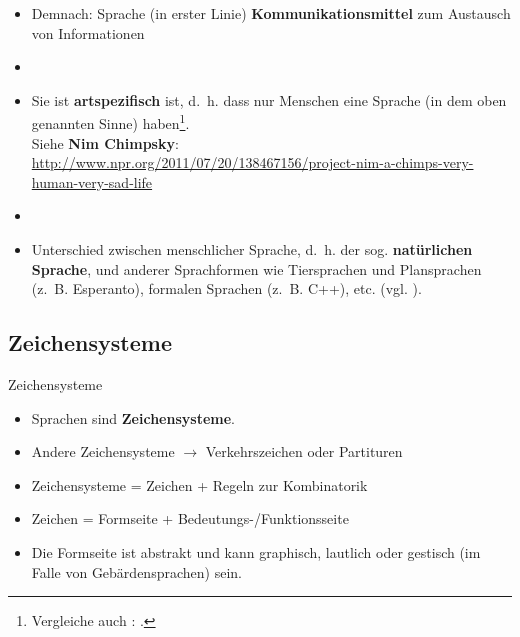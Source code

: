
\begin{frame}

\begin{itemize}
	\item<1-> Demnach: Sprache (in erster Linie) \textbf{Kommunikationsmittel} zum Austausch von Informationen
	\item[]
	\item<2-> Sie ist \textbf{artspezifisch} ist, d.~h. dass nur Menschen eine Sprache (in dem oben genannten Sinne) haben\footnote{Vergleiche auch \citet{Bussmann83a}: .}.\\
	Siehe \textbf{Nim Chimpsky}:\\
	\url{http://www.npr.org/2011/07/20/138467156/project-nim-a-chimps-very-human-very-sad-life}
	\item[]
	\item<3-> Unterschied zwischen menschlicher Sprache, d.~h. der sog. \textbf{natürlichen Sprache}, und anderer Sprachformen wie Tiersprachen und Plansprachen (z.~B. Esperanto), formalen Sprachen (z.~B. C++), etc. (vgl. \citet{Thuemmel00a}).\
\end{itemize}		

\end{frame}


%
\subsection{Zeichensysteme}
	
\begin{frame}{Zeichensysteme}
			
\begin{itemize}
	\item<1-> Sprachen sind \textbf{Zeichensysteme}.
	\item<1-> Andere Zeichensysteme $\rightarrow$ Verkehrszeichen oder Partituren
	\item<2-> Zeichensysteme = Zeichen + Regeln zur Kombinatorik
	\item<3-> Zeichen = Formseite + Bedeutungs-/Funktionsseite
	\item<3-> Die Formseite ist abstrakt und kann graphisch, lautlich oder gestisch (im Falle von Gebärdensprachen) sein.
\end{itemize}			
			
				

\end{frame}			

